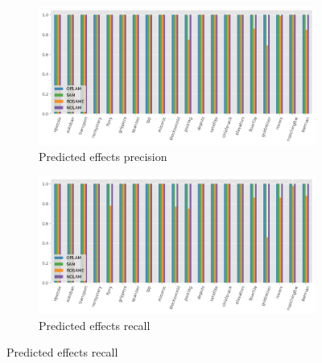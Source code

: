 \begin{figure}[ht]
  \begin{subfigure}[b]{0.45\textwidth}
    \includegraphics[width=\textwidth]{figures/10_traces/barplots/predeffs_precision.png}
    \caption{Predicted effects precision}
  \end{subfigure}
  \begin{subfigure}[b]{0.45\textwidth}
    \includegraphics[width=\textwidth]{figures/10_traces/barplots/predeffs_recall.png}
    \caption{Predicted effects recall}
  \end{subfigure}

  \vspace{1em}


\end{figure}
